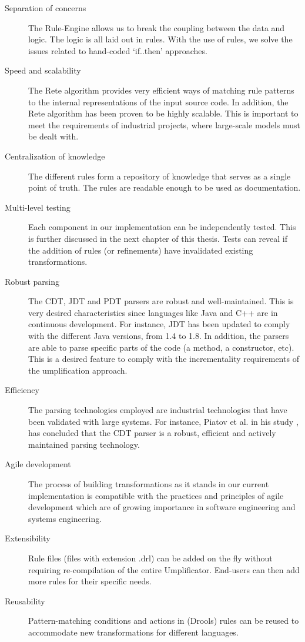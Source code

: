 \begin{description}
\item [Separation of concerns] The Rule-Engine allows us to break the coupling between the data and logic. The logic is all laid out in rules. With the use of rules, we solve the issues related to hand-coded `if..then' approaches.

\item [Speed and scalability] The Rete algorithm provides very efficient ways of matching rule patterns to the internal representations of the input source code. In addition, the Rete algorithm has been proven to be highly scalable. This is important to meet the requirements of industrial projects, where large-scale models must be dealt with.

\item [Centralization of knowledge] The different rules form a repository of knowledge that serves as a single point of truth. The rules are readable enough to be used as documentation. 

\item [Multi-level testing] Each component in our implementation can be independently tested. This is further discussed in the next chapter of this thesis. Tests can reveal if the addition of rules (or refinements) have invalidated existing transformations.

\item [Robust parsing] The CDT, JDT and PDT parsers are robust and well-maintained. This is very desired characteristics since languages like Java and C++ are in continuous development. For instance, JDT has been updated to comply with the different Java versions, from 1.4 to 1.8. In addition, the parsers are able to parse specific parts of the code (a method, a constructor, etc). This is a desired feature to comply with the incrementality requirements of the umplification approach. 

\item [Efficiency] The parsing technologies employed are industrial technologies that have been validated with large systems. For instance, Piatov et al. in his study \cite{CDTPARSER}, has concluded that the CDT parser is a robust, efficient and actively maintained parsing technology. 

\item [Agile development] The process of building transformations as it stands in our current implementation is compatible with the practices and principles of agile development which are of growing importance in software engineering \cite{agileDev} and systems engineering.

\item [Extensibility] Rule files (files with extension .drl) can be added on the fly without requiring re-compilation of the entire Umplificator. End-users can then add more rules for their specific needs. 

\item [Reusability] Pattern-matching conditions and actions in (Drools) rules can be reused to accommodate new transformations for different languages. 
\end{description}
